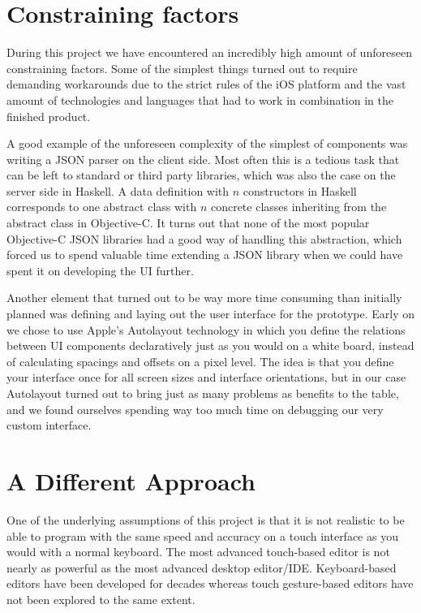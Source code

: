 \section{Constraining factors}
During this project we have encountered an incredibly high amount of unforeseen constraining factors. Some of the simplest things turned out to require demanding workarounds due to the strict rules of the iOS platform and the vast amount of technologies and languages that had to work in combination in the finished product.

A good example of the unforeseen complexity of the simplest of components was writing a JSON parser on the client side. Most often this is a tedious task that can be left to standard or third party libraries, which was also the case on the server side in Haskell. A data definition with $n$ constructors in Haskell corresponds to one abstract class with $n$ concrete classes inheriting from the abstract class in Objective-C. It turns out that none of the most popular Objective-C JSON libraries had a good way of handling this abstraction, which forced us to spend valuable time extending a JSON library when we could have spent it on developing the UI further.

Another element that turned out to be way more time consuming than initially planned was defining and laying out the user interface for the prototype. Early on we chose to use Apple's Autolayout technology in which you define the relations between UI components declaratively just as you would on a white board, instead of calculating spacings and offsets on a pixel level. The idea is that you define your interface once for all screen sizes and interface orientations, but in our case Autolayout turned out to bring just as many problems as benefits to the table, and we found ourselves spending way too much time on debugging our very custom interface.

\section{A Different Approach}
One of the underlying assumptions of this project is that it is not realistic to be able to program with the same speed and accuracy on a touch interface as you would with a normal keyboard. The most advanced touch-based editor is not nearly as powerful as the most advanced desktop editor/IDE\@. Keyboard-based editors have been developed for decades whereas touch gesture-based editors have not been explored to the same extent. 

